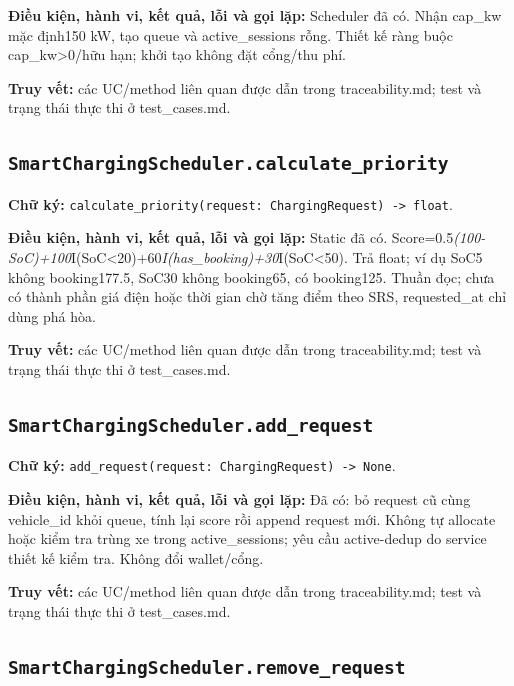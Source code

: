 \documentclass[11pt,a4paper]{article}
\begin{document}
\textbf{Điều kiện, hành vi, kết quả, lỗi và gọi lặp:} Scheduler đã có.
Nhận cap\_kw mặc định150 kW, tạo queue và active\_sessions rỗng. Thiết
kế ràng buộc cap\_kw\textgreater0/hữu hạn; khởi tạo không đặt cổng/thu
phí.

\textbf{Truy vết:} các UC/method liên quan được dẫn trong
traceability.md; test và trạng thái thực thi ở test\_cases.md.

\hypertarget{smartchargingscheduler.calculate_priority}{%
\subsection{\texorpdfstring{\texttt{SmartChargingScheduler.calculate\_priority}}{SmartChargingScheduler.calculate\_priority}}\label{smartchargingscheduler.calculate_priority}}

\textbf{Chữ ký:}
\texttt{calculate\_priority(request:\ ChargingRequest)\ -\textgreater{}\ float}.

\textbf{Điều kiện, hành vi, kết quả, lỗi và gọi lặp:} Static đã có.
Score=0.5\emph{(100-SoC)+100}I(SoC\textless20)+60\emph{I(has\_booking)+30}I(SoC\textless50).
Trả float; ví dụ SoC5 không booking177.5, SoC30 không booking65, có
booking125. Thuần đọc; chưa có thành phần giá điện hoặc thời gian chờ
tăng điểm theo SRS, requested\_at chỉ dùng phá hòa.

\textbf{Truy vết:} các UC/method liên quan được dẫn trong
traceability.md; test và trạng thái thực thi ở test\_cases.md.

\hypertarget{smartchargingscheduler.add_request}{%
\subsection{\texorpdfstring{\texttt{SmartChargingScheduler.add\_request}}{SmartChargingScheduler.add\_request}}\label{smartchargingscheduler.add_request}}

\textbf{Chữ ký:}
\texttt{add\_request(request:\ ChargingRequest)\ -\textgreater{}\ None}.

\textbf{Điều kiện, hành vi, kết quả, lỗi và gọi lặp:} Đã có: bỏ request
cũ cùng vehicle\_id khỏi queue, tính lại score rồi append request mới.
Không tự allocate hoặc kiểm tra trùng xe trong active\_sessions; yêu cầu
active-dedup do service thiết kế kiểm tra. Không đổi wallet/cổng.

\textbf{Truy vết:} các UC/method liên quan được dẫn trong
traceability.md; test và trạng thái thực thi ở test\_cases.md.

\hypertarget{smartchargingscheduler.remove_request}{%
\subsection{\texorpdfstring{\texttt{SmartChargingScheduler.remove\_request}}{SmartChargingScheduler.remove\_request}}\label{smartchargingscheduler.remove_request}}
\end{document}
